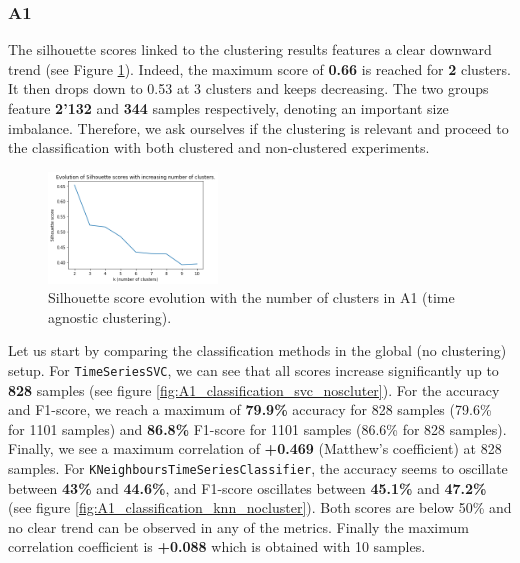 \documentclass[sigplan,screen]{acmart}
\begin{document}
\subsubsection{A1}

The silhouette scores linked to the clustering results features a clear downward trend (see Figure \ref{fig:A1_clustering_silhouette}). Indeed, the maximum score of \textbf{0.66} is reached for \textbf{2} clusters. It then drops down to 0.53 at 3 clusters and keeps decreasing. The two groups feature \textbf{2'132} and \textbf{344} samples respectively, denoting an important size imbalance. Therefore, we ask ourselves if the clustering is relevant and proceed to the classification with both clustered and non-clustered experiments.

\begin{figure}[h]
    \centering
    \includegraphics[width=0.4\textwidth]{reports/figures/A1_clustering_kmeans.png}
    \caption{Silhouette score evolution with the number of clusters in A1 (time agnostic clustering).}
    \label{fig:A1_clustering_silhouette}
\end{figure}

Let us start by comparing the classification methods in the global (no clustering) setup. For \texttt{TimeSeriesSVC}, we can see that all scores increase significantly up to \textbf{828} samples (see figure \ref{fig:A1_classification_svc_noscluter}). For the accuracy and F1-score, we reach a maximum of \textbf{79.9\%} accuracy for 828 samples (79.6\% for 1101 samples) and \textbf{86.8\%} F1-score for 1101 samples (86.6\% for 828 samples). Finally, we see a maximum correlation of \textbf{+0.469} (Matthew’s coefficient) at 828 samples.
For \texttt{KNeighboursTimeSeriesClassifier}, the accuracy seems to oscillate between \textbf{43\%} and \textbf{44.6\%}, and F1-score oscillates between \textbf{45.1\%} and \textbf{47.2\%} (see figure \ref{fig:A1_classification_knn_nocluster}). Both scores are below 50\% and no clear trend can be observed in any of the metrics. Finally the maximum correlation coefficient is \textbf{+0.088} which is obtained with 10 samples.
\end{document}
